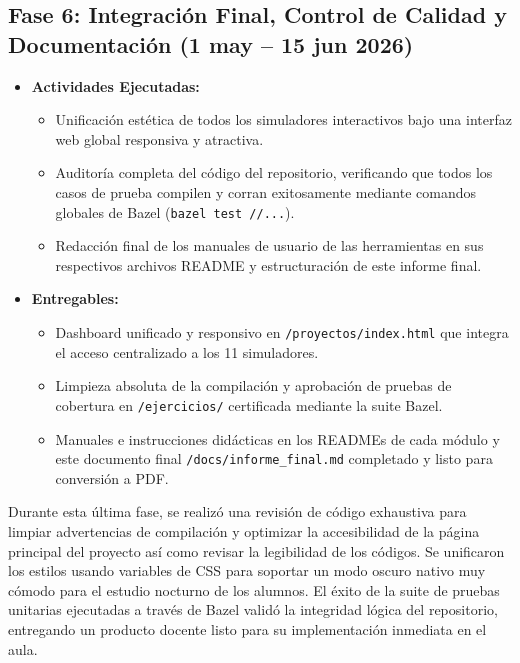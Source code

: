 \documentclass[12 pt]{article}
\begin{document}
\subsection*{Fase 6: Integración Final, Control de Calidad y Documentación (1 may – 15 jun 2026)}
\begin{itemize}
    \item \textbf{Actividades Ejecutadas:}
    \begin{itemize}
        \item Unificación estética de todos los simuladores interactivos bajo una interfaz web global responsiva y atractiva.
        \item Auditoría completa del código del repositorio, verificando que todos los casos de prueba compilen y corran exitosamente mediante comandos globales de Bazel (\texttt{bazel test //...}).
        \item Redacción final de los manuales de usuario de las herramientas en sus respectivos archivos README y estructuración de este informe final.
    \end{itemize}
    \item \textbf{Entregables:}
    \begin{itemize}
        \item Dashboard unificado y responsivo en \texttt{/proyectos/index.html} que integra el acceso centralizado a los 11 simuladores.
        \item Limpieza absoluta de la compilación y aprobación de pruebas de cobertura en \texttt{/ejercicios/} certificada mediante la suite Bazel.
        \item Manuales e instrucciones didácticas en los READMEs de cada módulo y este documento final \texttt{/docs/informe\_final.md} completado y listo para conversión a PDF.
    \end{itemize}
\end{itemize}

Durante esta última fase, se realizó una revisión de código exhaustiva para limpiar advertencias de compilación y optimizar la accesibilidad de la página principal del proyecto así como revisar la legibilidad de los códigos. Se unificaron los estilos usando variables de CSS para soportar un modo oscuro nativo muy cómodo para el estudio nocturno de los alumnos. El éxito de la suite de pruebas unitarias ejecutadas a través de Bazel validó la integridad lógica del repositorio, entregando un producto docente listo para su implementación inmediata en el aula.
\end{document}
